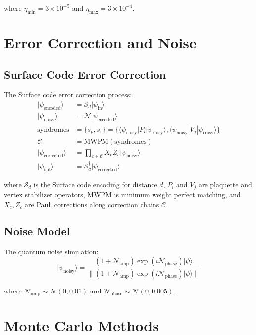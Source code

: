 \documentclass{article}
\begin{document}
where $\eta_{\text{min}}=3\times10^{-5}$ and $\eta_{\text{max}}=3\times10^{-4}$.

\section{Error Correction and Noise}

\subsection{Surface Code Error Correction}
The Surface code error correction process:
\begin{align*}
|\psi_{\text{encoded}}\rangle &= \mathcal{S}_d|\psi_{\text{in}}\rangle \\
|\psi_{\text{noisy}}\rangle &= \mathcal{N}|\psi_{\text{encoded}}\rangle \\
\text{syndromes} &= \{s_p, s_v\} = \{\langle \psi_{\text{noisy}}|P_i|\psi_{\text{noisy}}\rangle, \langle \psi_{\text{noisy}}|V_j|\psi_{\text{noisy}}\rangle\} \\
\mathcal{C} &= \text{MWPM}(\text{syndromes}) \\
|\psi_{\text{corrected}}\rangle &= \prod_{c \in \mathcal{C}} X_c Z_c |\psi_{\text{noisy}}\rangle \\
|\psi_{\text{out}}\rangle &= \mathcal{S}_d^\dagger|\psi_{\text{corrected}}\rangle
\end{align*}

where $\mathcal{S}_d$ is the Surface code encoding for distance $d$, $P_i$ and $V_j$ are plaquette and vertex stabilizer operators, MWPM is minimum weight perfect matching, and $X_c, Z_c$ are Pauli corrections along correction chains $\mathcal{C}$.

\subsection{Noise Model}
The quantum noise simulation:
\begin{equation}
|\psi_{\text{noisy}}\rangle = \frac{(1 + \mathcal{N}_{\text{amp}})\exp(i\mathcal{N}_{\text{phase}})|\psi\rangle}{\|(1 + \mathcal{N}_{\text{amp}})\exp(i\mathcal{N}_{\text{phase}})|\psi\rangle\|}
\end{equation}

where $\mathcal{N}_{\text{amp}} \sim \mathcal{N}(0,0.01)$ and $\mathcal{N}_{\text{phase}} \sim \mathcal{N}(0,0.005)$.

\section{Monte Carlo Methods}
\end{document}
